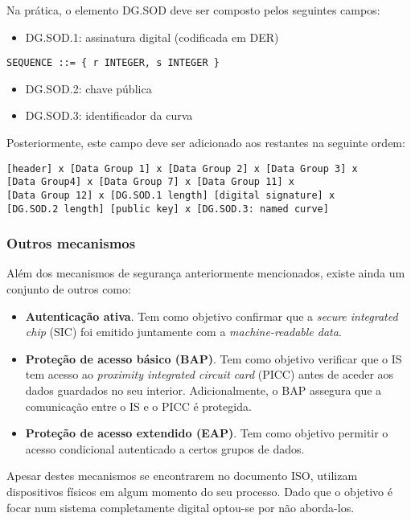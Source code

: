 Na prática, o elemento DG.SOD deve ser composto pelos seguintes campos:

\begin{itemize}
\item DG.SOD.1: assinatura digital (codificada em DER)
\end{itemize}
\begin{Verbatim}
SEQUENCE ::= { r INTEGER, s INTEGER }
\end{Verbatim}
\begin{itemize}
\item DG.SOD.2: chave pública
\item DG.SOD.3: identificador da curva
\end{itemize}

Posteriormente, este campo deve ser adicionado aos restantes na seguinte
ordem: 

\begin{Verbatim}
[header] x [Data Group 1] x [Data Group 2] x [Data Group 3] x 
[Data Group4] x [Data Group 7] x [Data Group 11] x 
[Data Group 12] x [DG.SOD.1 length] [digital signature] x 
[DG.SOD.2 length] [public key] x [DG.SOD.3: named curve]
\end{Verbatim}


\subsubsection{Outros mecanismos}

Além dos mecanismos de segurança anteriormente mencionados, existe ainda 
um conjunto de outros como:

\begin{itemize}
    \item \textbf{Autenticação ativa}. Tem como objetivo confirmar que a \emph{secure integrated chip} (SIC) foi emitido juntamente com a \emph{machine-readable data}.
    \item \textbf{Proteção de acesso básico (BAP)}. Tem como objetivo verificar que o IS tem acesso ao \emph{proximity integrated circuit card} (PICC) antes de aceder aos dados guardados no seu interior. Adicionalmente, o BAP assegura que a comunicação entre o IS e o PICC é protegida. 
    \item \textbf{Proteção de acesso extendido (EAP)}. Tem como objetivo permitir o acesso condicional autenticado a certos grupos de dados.
\end{itemize}

Apesar destes mecanismos se encontrarem no documento ISO, utilizam dispositivos físicos 
em algum momento do seu processo. Dado que o objetivo é focar num sistema 
completamente digital optou-se por não aborda-los.


